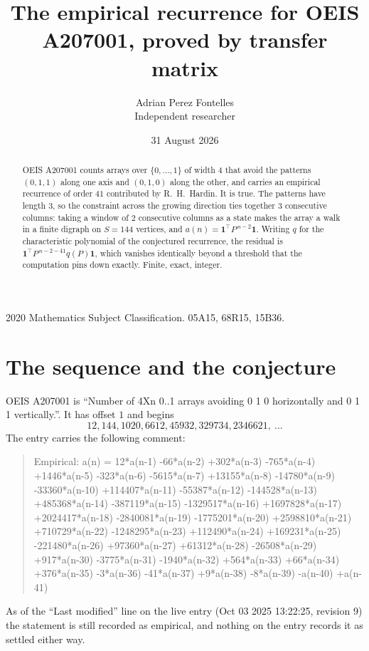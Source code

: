 \documentclass[11pt,a4paper]{article}
\title{The empirical recurrence for OEIS A207001, proved by transfer matrix}
\author{Adrian Perez Fontelles\\ \small Independent researcher}
\date{31 August 2026}
\theoremstyle{plain}
\theoremstyle{definition}
\begin{document}
\maketitle

\begin{abstract}
OEIS A207001 counts arrays over $\{0,\dots,1\}$ of width $4$ that avoid the patterns
$(0,1,1)$ along one axis and $(0,1,0)$ along the other, and carries an empirical recurrence of
order $41$ contributed by R.~H.~Hardin. It is true. The patterns have length $3$, so
the constraint across the growing direction ties together $3$ consecutive columns: taking a
window of $2$ consecutive columns as a state makes the array a walk in a finite digraph
on $S=144$ vertices, and $a(n)=\mathbf{1}^{\!\top}P^{\,n-2}\mathbf{1}$. Writing $q$
for the characteristic polynomial of the conjectured recurrence, the residual is
$\mathbf{1}^{\!\top}P^{\,n-2-41}q(P)\mathbf{1}$, which vanishes identically
beyond a threshold that the computation pins down exactly. Finite, exact, integer.
\end{abstract}

\noindent\small 2020 Mathematics Subject Classification. 05A15, 68R15, 15B36.\normalsize

\section{The sequence and the conjecture}

OEIS A207001 is ``Number of 4Xn 0..1 arrays avoiding 0 1 0 horizontally and 0 1 1 vertically.''. It has offset
$1$ and begins
\[
12, 144, 1020, 6612, 45932, 329734, 2346621,\ \dots
\]
The entry carries the following comment:
\begin{quote}\small
Empirical: a(n) = 12*a(n-1) -66*a(n-2) +302*a(n-3) -765*a(n-4) +1446*a(n-5) -323*a(n-6) -5615*a(n-7) +13155*a(n-8) -14780*a(n-9) -33360*a(n-10) +114407*a(n-11) -55387*a(n-12) -144528*a(n-13) +485368*a(n-14) -387119*a(n-15) -1329517*a(n-16) +1697828*a(n-17) +2024417*a(n-18) -2840081*a(n-19) -1775201*a(n-20) +2598810*a(n-21) +710729*a(n-22) -1248295*a(n-23) +112490*a(n-24) +169231*a(n-25) -221480*a(n-26) +97360*a(n-27) +61312*a(n-28) -26508*a(n-29) +917*a(n-30) -3775*a(n-31) -1940*a(n-32) +564*a(n-33) +66*a(n-34) +376*a(n-35) -3*a(n-36) -41*a(n-37) +9*a(n-38) -8*a(n-39) -a(n-40) +a(n-41)
\end{quote}
As of the ``Last modified'' line on the live entry (Oct 03 2025 13:22:25, revision
9) the statement is still recorded as empirical, and nothing on the entry
records it as settled either way.
\end{document}
